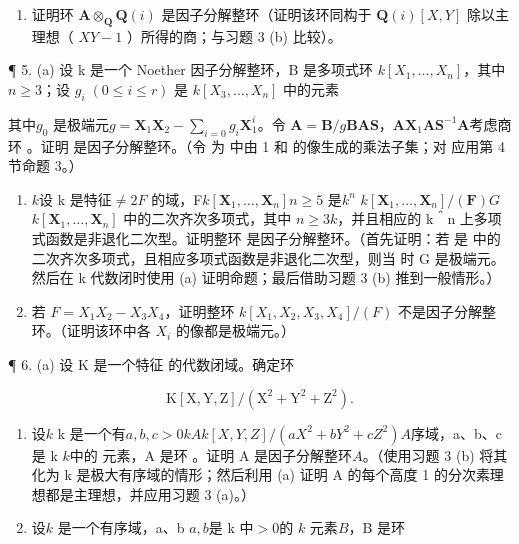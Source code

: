 \begin{enumerate}
\def\labelenumi{(\alph{enumi})}
\setcounter{enumi}{1}
\tightlist
\item
  证明环 \(\mathbf{A} \otimes_{\mathbf{Q}} \mathbf{Q}(i)\) 是因子分解整环（证明该环同构于 \(\mathbf{Q}(i) [X, Y]\) 除以主理想（ \(XY - 1\) ）所得的商；与习题 3 (b) 比较）。
\end{enumerate}

¶ 5. (a) 设 k 是一个 Noether 因子分解整环，B 是多项式环 \(k[X_{1},\ldots,X_{n}]\)，其中 \(n\geqslant3\)；设 \(g_{i}\;(0\leqslant i\leqslant r)\) 是 \(k[X_{3},\ldots,X_{n}]\) 中的元素

其中\(g_0\)  是极端元\(g = \mathbf{X}_1\mathbf{X}_2 - \sum_{i=0} g_i\mathbf{X}_1^i\)。令 \(\mathbf{A} = \mathbf{B}/g\mathbf{B}\)\(\mathbf{A}\)\(\mathbf{S}\)，\(\mathbf{A}\)\(\mathbf{X}_1\)\(\mathbf{A}\)\(\mathbf{S}^{-1}\mathbf{A}\)考虑商环 。证明  是因子分解整环。（令  为  中由 1 和  的像生成的乘法子集；对  应用第 4 节命题 3。）

\begin{enumerate}
\def\labelenumi{(\alph{enumi})}
\setcounter{enumi}{1}
\item
  \(k\)设 k 是特征\(\neq 2\)\(F\)  的域，F\(k[\mathbf{X}_1, \ldots, \mathbf{X}_n]\)\(n \geqslant 5\) 是\(k^n\) \(k[\mathbf{X}_1, \ldots, \mathbf{X}_n] / (\mathbf{F})\)\(G\)\(k[\mathbf{X}_1, \ldots, \mathbf{X}_n]\) 中的二次齐次多项式，其中 \(n \geqslant 3\)\(k\)，并且相应的 k＾n 上多项式函数是非退化二次型。证明整环  是因子分解整环。（首先证明：若  是  中的二次齐次多项式，且相应多项式函数是非退化二次型，则当  时 G 是极端元。然后在 k 代数闭时使用 (a) 证明命题；最后借助习题 3 (b) 推到一般情形。）
\item
  若 \(F = X_{1}X_{2} - X_{3}X_{4}\)，证明整环 \(k[X_{1}, X_{2}, X_{3}, X_{4}]/(F)\) 不是因子分解整环。（证明该环中各 \(X_{i}\) 的像都是极端元。）
\end{enumerate}

¶ 6. (a) 设 K 是一个特征  的代数闭域。确定环

\[
\mathrm{K} [ \mathrm{X}, \mathrm{Y}, \mathrm{Z} ] / (\mathrm{X} ^ {2} + \mathrm{Y} ^ {2} + \mathrm{Z} ^ {2}).
\]

\begin{enumerate}
\def\labelenumi{(\alph{enumi})}
\setcounter{enumi}{1}
\item
  设\(k\) k 是一个有\(a, b, c\)\(>0\)\(k\)\(A\)\(k[X, Y, Z] / (aX^2 + bY^2 + cZ^2)\)\(A\)序域，a、b、c 是 k \(k\)中的  元素，A 是环 。证明 A 是因子分解整环\(A\)。（使用习题 3 (b) 将其化为 k 是极大有序域的情形；然后利用 (a) 证明 A 的每个高度 1 的分次素理想都是主理想，并应用习题 3 (a)。）
\item
  设\(k\)  是一个有序域，a、b \(a, b\)是 k 中\(> 0\)的 \(k\) 元素\(B\)，B 是环
\end{enumerate}

